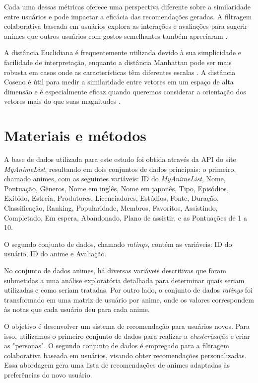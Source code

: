 \documentclass[twocolumn]{rbef}
\newcommand{\1}{\mathbbm{1}}
\begin{document}
Cada uma dessas métricas oferece uma perspectiva diferente sobre a similaridade entre usuários e pode impactar a eficácia das recomendações geradas. A filtragem colaborativa baseada em usuários explora as interações e avaliações para sugerir animes que outros usuários com gostos semelhantes também apreciaram \cite{Schafer}.

A distância Euclidiana é frequentemente utilizada devido à sua simplicidade e facilidade de interpretação, enquanto a distância Manhattan pode ser mais robusta em casos onde as características têm diferentes escalas \cite{Hastie}. A distância Coseno é útil para medir a similaridade entre vetores em um espaço de alta dimensão e é especialmente eficaz quando queremos considerar a orientação dos vetores mais do que suas magnitudes \cite{Manning}.

\section{Materiais e métodos} \label{metodos}

A base de dados utilizada para este estudo foi obtida através da API\cite{API} do site \textit{MyAnimeList}, resultando em dois conjuntos de dados principais: o primeiro, chamado animes, com as seguintes variáveis: ID do \textit{MyAnimeList}, Nome, Pontuação, Gêneros, Nome em inglês, Nome em japonês, Tipo, Episódios, Exibido, Estreia, Produtores, Licenciadores, Estúdios, Fonte, Duração, Classificação, Ranking, Popularidade, Membros, Favoritos, Assistindo, Completado, Em espera, Abandonado, Plano de assistir, e as Pontuações de 1 a 10.

O segundo conjunto de dados, chamado \textit{ratings}, contém as variáveis: ID do usuário, ID do anime e Avaliação.

No conjunto de dados animes, há diversas variáveis descritivas que foram submetidas a uma análise exploratória detalhada para determinar quais seriam utilizadas e como seriam tratadas. Por outro lado, o conjunto de dados \textit{ratings} foi transformado em uma matriz de usuário por anime, onde os valores correspondem às notas que cada usuário deu para cada anime.

O objetivo é desenvolver um sistema de recomendação para usuários novos. Para isso, utilizamos o primeiro conjunto de dados para realizar a \textit{clusterização} e criar as "personas". O segundo conjunto de dados é empregado para a filtragem colaborativa baseada em usuários, visando obter recomendações personalizadas. Essa abordagem gera uma lista de recomendações de animes adaptadas às preferências do novo usuário.
\end{document}
